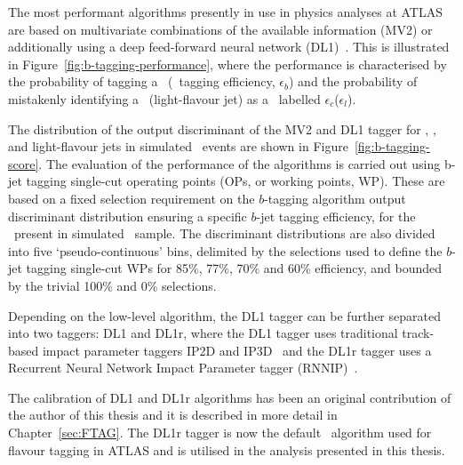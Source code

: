 The most performant algorithms presently in use in physics 
analyses at ATLAS are based on multivariate combinations 
of the available information (MV2) or additionally using a
deep feed-forward neural network (DL1)~\cite{tagging,ATL-PHYS-PUB-2017-013}.
This is illustrated in Figure~\ref{fig:b-tagging-performance}, 
where the performance
is characterised by the probability of 
tagging a \bjet\ (\bjet\ tagging efficiency, 
$\epsilon_b$) and the probability of mistakenly identifying 
a \cjet\ (light-flavour jet) as a \bjet\, 
labelled $\epsilon_c$($\epsilon_l$). 


The distribution of the output discriminant
of the MV2 and DL1 tagger for \bjets, \cjets, and light-flavour jets
in simulated \ttbar\ events are shown in Figure~\ref{fig:b-tagging-score}.
The evaluation of the performance of the algorithms is carried out using
b-jet tagging single-cut operating points (OPs, or working points, WP). 
These are based on a fixed selection requirement 
on the $b$-tagging algorithm output discriminant 
distribution ensuring a specific $b$-jet tagging efficiency, 
for the \bjets\ present in simulated \ttbar\ sample. 
The discriminant distributions are also divided into 
five `pseudo-continuous' bins, delimited by the
selections used to define the $b$-jet tagging single-cut WPs 
for 85\%, 77\%, 70\% and 60\% efficiency, and
bounded by the trivial 100\% and 0\% selections. 

Depending on the low-level algorithm, 
the DL1 tagger can be further separated into two taggers: DL1 and DL1r,
where the DL1 tagger uses traditional track-based impact parameter 
taggers IP2D and IP3D~\cite{ATL-PHYS-PUB-2016-012} 
and the DL1r tagger uses a Recurrent Neural Network Impact Parameter tagger 
(RNNIP)~\cite{ATL-PHYS-PUB-2017-013}. 


The calibration of DL1 and DL1r algorithms has been an original contribution 
of the author of this thesis and it is described in more detail in Chapter~\ref{sec:FTAG}.
The DL1r tagger is now the 
default \btagging\ algorithm used for flavour tagging in ATLAS and is
utilised in the analysis presented in this thesis.


